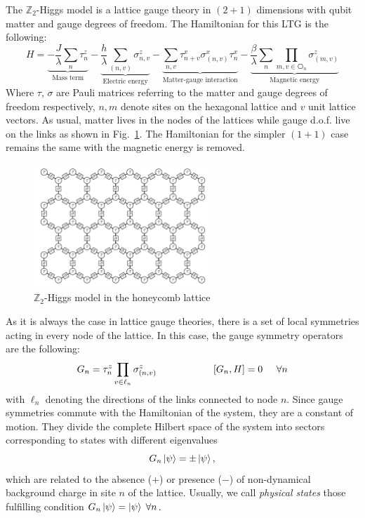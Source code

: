 \documentclass[a4paper]{article}
\begin{document}
The $\mathbb{Z}_2$-Higgs model is a lattice gauge theory in $(2+1)$ dimensions with qubit matter and gauge degrees of freedom. The Hamiltonian for this LTG is the following:
%
\begin{equation}
    H = \underbrace{-\frac{J}{\lambda} \sum_{n} \tau_{n}^z}_{\text{Mass term}} - \underbrace{\frac{h}{\lambda} \sum_{(n, v)} \sigma_{n, v}^{z}}_{\text{Electric energy}} - \underbrace{\sum_{n, v} \tau_{n + v}^x \sigma_{(n, v)}^x \tau_{n}^x}_{\text{Matter-gauge interaction}} - \underbrace{\frac{\beta}{\lambda} \sum_{n} \prod_{m, v \in \hexagon_n} \sigma_{(m, v)}^z}_{\text{Magnetic energy}}
    \label{eq:hamiltonian}
\end{equation}
%
Where $\tau$, $\sigma$ are Pauli matrices referring to the matter and gauge degrees of freedom respectively, $n, m$ denote sites on the hexagonal lattice and $v$ unit lattice vectors. As usual, matter lives in the nodes of the lattices while gauge d.o.f. live on the links as shown in Fig.~\ref{fig:lattice}. The Hamiltonian for the simpler $(1+1)$ case remains the same with the magnetic energy is removed.

\begin{figure}
    \centering
    \includegraphics[width=0.6\textwidth]{honeycomb.pdf}
    \caption{$\mathbb{Z}_2$-Higgs model in the honeycomb lattice}
    \label{fig:lattice}
\end{figure}

As it is always the case in lattice gauge theories, there is a set of local symmetries acting in every node of the lattice. In this case, the gauge symmetry operators are the following:
%
\begin{equation}
    G_n = \tau_n^z \prod_{v \in \ell_n} \sigma_{(n, v)}^z \hspace{2cm} \left[G_n, H\right] = 0 \hspace{0.5cm} \forall n
    \label{eq:gauge}
\end{equation}
%
with $\ell_n$ denoting the directions of the links connected to node $n$. Since gauge symmetries commute with the Hamiltonian of the system, they are a constant of motion. They divide the complete Hilbert space of the system into sectors corresponding to states with different eigenvalues
%
\begin{equation}
    G_n \ket{\psi} = \pm \ket{\psi},
\end{equation}
%
which are related to the absence ($+$) or presence ($-$) of non-dynamical background charge in site $n$ of the lattice. Usually, we call \textit{physical states} those fulfilling condition $G_n\ket{\psi} = \ket{\psi}\; \forall n$.
\end{document}
